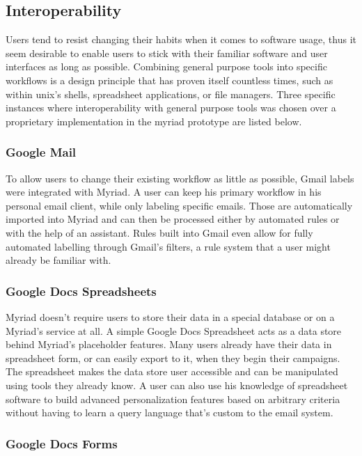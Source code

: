 \subsection{Interoperability}

Users tend to resist changing their habits when it comes to software usage, thus it seem desirable to enable users to stick with their familiar software and user interfaces as long as possible. Combining general purpose tools into specific workflows is a design principle that has proven itself countless times, such as within unix’s shells, spreadsheet applications, or file managers.
Three specific instances where interoperability with general purpose tools was chosen over a proprietary implementation in the myriad prototype are listed below.

\subsubsection{Google Mail}

To allow users to change their existing workflow as little as possible, Gmail labels were integrated with Myriad. A user can keep his primary workflow in his personal email client, while only labeling specific emails. Those are automatically imported into Myriad and can then be processed either by automated rules or with the help of an assistant. Rules built into Gmail even allow for fully automated labelling through Gmail’s filters, a rule system that a user might already be familiar with.

\subsubsection{Google Docs Spreadsheets}

Myriad doesn't require users to store their data in a special database or on a Myriad's service at all. A simple Google Docs Spreadsheet acts as a data store behind Myriad's placeholder features. Many users already have their data in spreadsheet form, or can easily export to it, when they begin their campaigns. The spreadsheet makes the data store user accessible and can be manipulated using tools they already know. A user can also use his knowledge of spreadsheet software to build advanced personalization features based on arbitrary criteria without having to learn a query language that's custom to the email system.

\subsubsection{Google Docs Forms}

